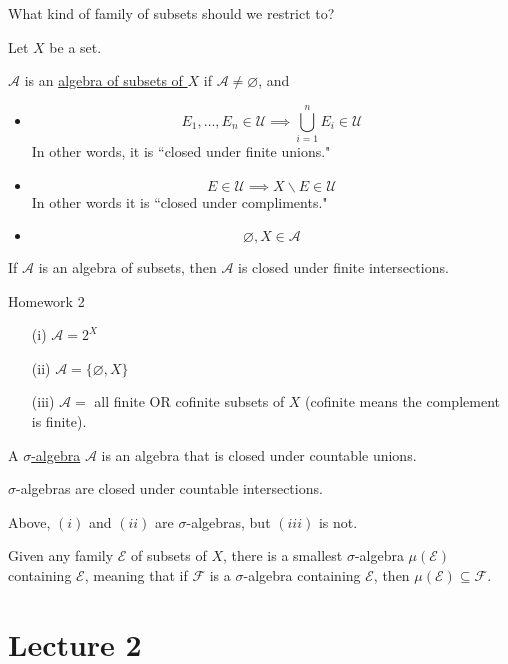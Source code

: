 \documentclass[x11names,reqno,14pt]{extarticle}
\begin{document}
What kind of family of subsets should we restrict to? 

Let $X$ be a set. 

 $\mathcal{A}$ is an \underline{algebra of subsets of $X$} if $\mathcal{A} \neq \varnothing$, and 
\begin{itemize}
\item 
\[
E_1, \dots, E_n \in \mathcal{U} \implies \bigcup_{i=1}^nE_i \in \mathcal{U}
\]
In other words, it is ``closed under finite unions." 
\item
\[
E \in \mathcal{U} \implies X \backslash E \in \mathcal{U}
\]
In other words it is ``closed under compliments."
\item 
\[
\varnothing, X \in \mathcal{A}
\]
\end{itemize}

\lem 

If $\mathcal{A}$ is an algebra of subsets, then $\mathcal{A}$ is closed under finite intersections.

\proof 

Homework 2

\exm

\begin{itemize}
\item[(i)] $\mathcal{A} = 2^X$
\item[(ii)] $\mathcal{A} = \{\varnothing, X\}$
\item[(iii)] $\mathcal{A} =$ all finite OR cofinite subsets of $X$ (cofinite means the complement is finite). 
\end{itemize}

 A \underline{$\sigma$-algebra} $\mathcal{A}$ is an algebra that is closed under countable unions. 

\rem

$\sigma$-algebras are closed under countable intersections. 

\exm

Above, $(i)$ and $(ii)$ are $\sigma$-algebras, but $(iii)$ is not. 

\prop

Given any family $\mathcal{E}$ of subsets of $X$, there is a smallest $\sigma$-algebra $\mu(\mathcal{E})$ containing $\mathcal{E}$, meaning that if $\mathcal{F}$ is a $\sigma$-algebra containing $\mathcal{E}$, then $\mu(\mathcal{E}) \subseteq \mathcal{F}$. 


\section*{Lecture 2}
\end{document}
